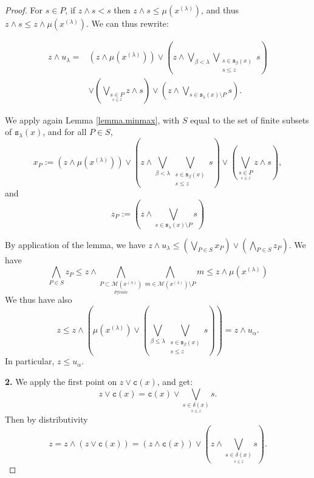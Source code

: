 \documentclass{article}
\begin{document}
\begin{proof}
{For $s \in P$, if $z \wedge s < s$ then $z \wedge s \le \mu(x^{(\lambda)})$, and thus 
$z \wedge s \le z \wedge \mu(x^{(\lambda)})$. We can thus rewrite: 

\[
\begin{aligned}
z \wedge u_{\lambda}
  ={}&(z \wedge \mu(x^{(\lambda)}))
   \vee \left(z \wedge \bigvee_{\beta < \lambda}
        \bigvee_{\substack{s \in \texttt{s}_{\beta}(x)\\ s \le z}} s\right) \\
   &\vee \left(\bigvee_{\underset{s \le z}{s \in P}} z \wedge s\right) \vee \left(z \wedge \bigvee_{s \in \texttt{s}_{\lambda}(x)\setminus P} s\right).
\end{aligned}
\]

We apply again Lemma \ref{lemma.minmax}, with $S$ equal to the set of finite subsets of $\texttt{s}_{\lambda}(x)$, and for all $P \in S$, 
\[x_P := (z \wedge \mu(x^{(\lambda)}))
   \vee \left(z \wedge \bigvee_{\beta < \lambda}
        \bigvee_{\substack{s \in \texttt{s}_{\beta}(x)\\ s \le z}} s\right) \vee \left(\bigvee_{\underset{s \le z}{s \in P}} z \wedge s\right),\]
and 
\[z_P := \left(z \wedge \bigvee_{s \in \texttt{s}_{\lambda}(x)\setminus P} s\right)\]

By application of the lemma, 
we have $z \wedge u_{\lambda} \le \left(\bigvee_{P \in S} x_P\right) \vee \left(\bigwedge_{P \in S} z_P\right)$. We have 
\[\bigwedge_{P \in S} z_P \le z \wedge \bigwedge_{\underset{P finite}{P \subset \mathcal{M}(x^{(\lambda)})}} \bigwedge_{m \in \mathcal{M}(x^{(\lambda)})\setminus P} m \le z \wedge \mu(x^{(\lambda)})\]
We thus have also 
\[z \le z \wedge \left(\mu(x^{(\lambda)}) \vee  \left(\bigvee_{\beta \le \lambda}
        \bigvee_{\substack{s \in \texttt{s}_{\beta}(x)\\ s \le z}} s\right)\right) = z \wedge u_{\alpha}.\]
In particular, $z \le u_{\alpha}$.
}


{
\textbf{2.} We apply the first point on $z \vee \texttt{c}(x)$, and get: 
\[z \vee \texttt{c}(x) = \texttt{c}(x) \vee \bigvee_{\underset{s \le z}{s \in \delta(x)}} s.\]
Then by distributivity 
\[z = z \wedge (z \vee \texttt{c}(x)) = (z \wedge \texttt{c}(x)) \vee \left(z \wedge  \bigvee_{\underset{s \le z}{s \in \delta(x)}} s\right).\]

}
\end{proof}
\end{document}
